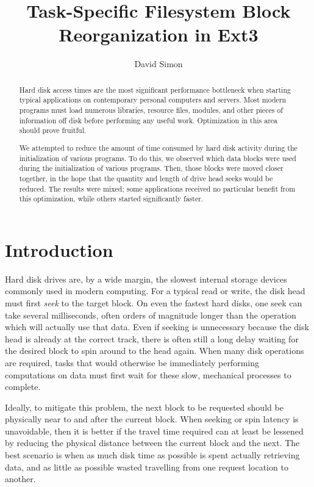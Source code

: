 \documentclass[10pt,twocolumn,letterpaper]{article}
\author{David Simon}
\title{Task-Specific Filesystem Block Reorganization in Ext3}
\begin{document}
\maketitle

\begin{abstract}
Hard disk access times are the most significant performance bottleneck when
starting typical applications on contemporary personal computers and servers.
Most modern programs must load numerous libraries, resource files, modules, and
other pieces of information off disk before performing any useful work. Optimization
in this area should prove fruitful.

We attempted to reduce the amount of time consumed by hard disk activity during
the initialization of various programs. To do this, we observed which data blocks were
used during the initialization of various programs. Then, those blocks were moved
closer together, in the hope that the quantity and length of drive head seeks
would be reduced. The results were mixed; some applications received no particular
benefit from this optimization, while others started significantly faster.
\end{abstract}

\section{Introduction}

Hard disk drives are, by a wide margin, the slowest internal storage devices commonly
used in modern computing. For a typical read or write, the disk head must first
\emph{seek} to the target block\cite{seektime}. On even the fastest hard disks\cite{deskstar}, one seek
can take several milliseconds, often orders of magnitude longer than the operation which will actually
use that data. Even if seeking is unnecessary because the disk head is already at the correct track, there is
often still a long delay waiting for the desired block to spin around to the head again\cite{latency}. When
many disk operations are required, tasks that would otherwise be immediately performing computations on data must first wait for these slow, mechanical processes to complete.

Ideally, to mitigate this problem, the next block to be requested should be physically near to
and after the current block\cite{autolocality}. When seeking or spin latency is unavoidable, then it is better if the travel time required can at least be lessened by reducing the
physical distance between the current block and the next. The best scenario is when
as much disk time as possible is spent actually retrieving data, and as little as possible
wasted travelling from one request location to another.
\end{document}
